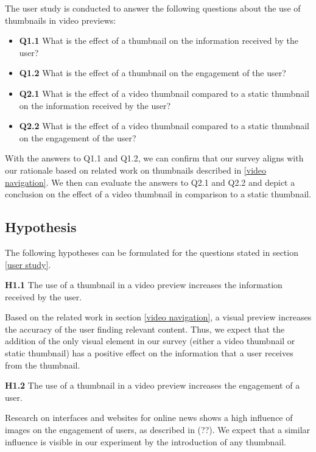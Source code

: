 \documentclass{../resources/sig-alternate-05-2015}
\begin{document}
The user study is conducted to answer the following questions about the use of thumbnails in video previews:

\begin{itemize}
	\item \textbf{Q1.1} What is the effect of a thumbnail on the information received by the user?
	\item \textbf{Q1.2} What is the effect of a thumbnail on the engagement of the user?
	\item \textbf{Q2.1} What is the effect of a video thumbnail compared to a static thumbnail on the information received by the user?
	\item \textbf{Q2.2} What is the effect of a video thumbnail compared to a static thumbnail on the engagement of the user?
\end{itemize}

With the answers to Q1.1 and Q1.2, we can confirm that our survey aligns with our rationale based on related work on thumbnails described in \ref{video navigation}. We then can evaluate the answers to Q2.1 and Q2.2 and depict a conclusion on the effect of a video thumbnail in comparison to a static thumbnail.

\subsection{Hypothesis}

The following hypotheses can be formulated for the questions stated in section \ref{user study}.

\textbf{H1.1} The use of a thumbnail in a video preview increases the information received by the user.

Based on the related work in section \ref{video navigation}, a visual preview increases the accuracy of the user finding relevant content. Thus, we expect that the addition of the only visual element in our survey (either a video thumbnail or static thumbnail) has a positive effect on the information that a user receives from the thumbnail.

\textbf{H1.2} The use of a thumbnail in a video preview increases the engagement of a user.

Research on interfaces and websites for online news shows a high influence of images on the engagement of users, as described in (??). We expect that a similar influence is visible in our experiment by the introduction of any thumbnail.
\end{document}
